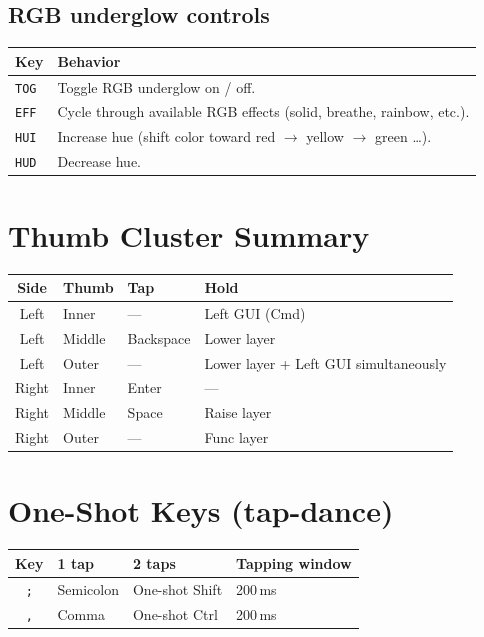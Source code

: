 \documentclass[11pt, letterpaper]{article}
\begin{document}
\subsection*{RGB underglow controls}

\begin{tabular}{lp{9cm}}
\toprule
\textbf{Key}  & \textbf{Behavior} \\
\midrule
\texttt{TOG}  & Toggle RGB underglow on / off. \\
\texttt{EFF}  & Cycle through available RGB effects (solid, breathe, rainbow, etc.). \\
\texttt{HUI}  & Increase hue (shift color toward red $\to$ yellow $\to$ green \ldots). \\
\texttt{HUD}  & Decrease hue. \\
\bottomrule
\end{tabular}

\section{Thumb Cluster Summary}

\begin{center}
\begin{tabular}{clll}
\toprule
\textbf{Side} & \textbf{Thumb} & \textbf{Tap} & \textbf{Hold} \\
\midrule
Left  & Inner  & --- & Left GUI (Cmd) \\
Left  & Middle & Backspace & Lower layer \\
Left  & Outer  & --- & Lower layer + Left GUI simultaneously \\
Right & Inner  & Enter & --- \\
Right & Middle & Space & Raise layer \\
Right & Outer  & --- & Func layer \\
\bottomrule
\end{tabular}
\end{center}

\section{One-Shot Keys (tap-dance)}

\begin{center}
\begin{tabular}{clll}
\toprule
\textbf{Key} & \textbf{1 tap} & \textbf{2 taps} & \textbf{Tapping window} \\
\midrule
\texttt{;} & Semicolon & One-shot Shift & 200\,ms \\
\texttt{,} & Comma     & One-shot Ctrl  & 200\,ms \\
\bottomrule
\end{tabular}
\end{center}
\end{document}
